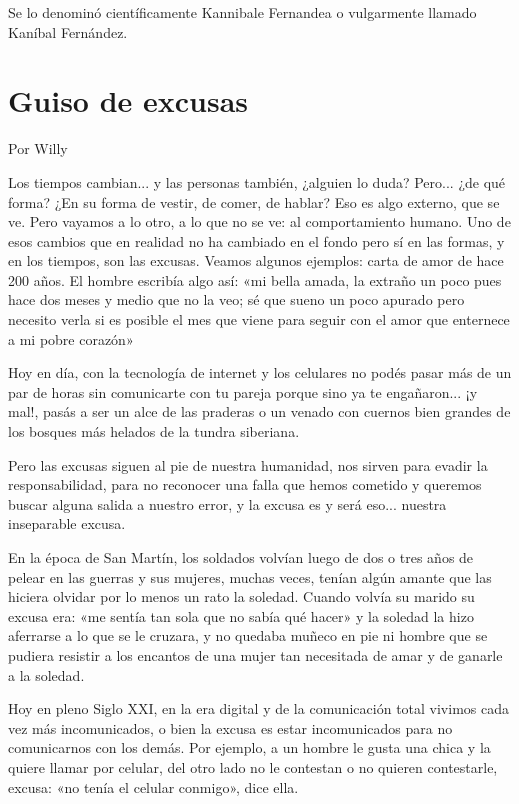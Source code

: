 \documentclass[11pt,twoside,openright,a5paper]{book}
\begin{document}
Se lo denominó científicamente Kannibale Fernandea o vulgarmente llamado Kaníbal Fernández.
\clearpage
\section*{Guiso de excusas}
                                                                                                    \begin{flushright}Por Willy\end{flushright}

Los tiempos cambian... y las personas también, ¿alguien lo duda? Pero... ¿de qué forma? ¿En su forma de vestir, de comer, de hablar? Eso es algo externo, que se ve. Pero vayamos a lo otro, a lo que no se ve: al comportamiento humano. Uno de esos cambios que en realidad no ha cambiado en el fondo pero sí en las formas, y en los tiempos, son las excusas. Veamos algunos ejemplos: carta de amor de hace 200 años. El hombre escribía algo así: «mi bella amada, la extraño un poco pues hace dos meses y medio que no la veo; sé que sueno un poco apurado pero necesito verla si es posible el mes que viene para seguir con el amor que enternece a mi pobre corazón»

Hoy en día, con la tecnología de internet y los celulares no podés pasar más de un par de horas sin comunicarte con tu pareja porque sino ya te engañaron... ¡y mal!, pasás a ser un alce de las praderas o un venado con cuernos bien grandes de los bosques más helados de la tundra siberiana.

Pero las excusas siguen al pie de nuestra humanidad, nos sirven para evadir la responsabilidad, para no reconocer una falla que hemos cometido y queremos buscar alguna salida a nuestro error, y la excusa es y será eso... nuestra inseparable excusa.

En la época de San Martín, los soldados volvían luego de dos o tres años de pelear en las guerras y sus mujeres, muchas veces, tenían algún amante que las hiciera olvidar por lo menos un rato la soledad. Cuando volvía su marido su excusa era: «me sentía tan sola que no sabía qué hacer» y la soledad la hizo aferrarse a lo que se le cruzara, y no quedaba muñeco en pie ni hombre que se pudiera resistir a los encantos de una mujer tan necesitada de amar y de ganarle a la soledad.

Hoy en pleno Siglo XXI, en la era digital y de la comunicación total vivimos cada vez más incomunicados, o bien la excusa es estar incomunicados para no comunicarnos con los demás. Por ejemplo, a un hombre le gusta una chica y la quiere llamar por celular, del otro lado no le contestan o no quieren contestarle, excusa: «no tenía el celular conmigo», dice ella.
\end{document}
